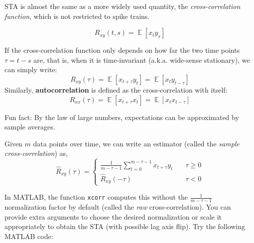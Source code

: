 \documentclass[letterpaper,11pt]{exam}
\DeclareMathOperator*{\E}{\mathbb{E}} %
\begin{document}
\begin{questions}
\newpage
STA is almost the same as a more widely used quantity, the \emph{cross-correlation function}, which is not restricted to spike trains.
\begin{tcolorbox}[colback=red!5!white,colframe=red!50!black]
\noindent
\begin{equation}
    R_{xy}(t,s) = \E[x_{t}y_s]
\end{equation}
\end{tcolorbox}
If the cross-correlation function only depends on how far the two time points $\tau = t-s$ are, that is, when it is time-invariant (a.k.a. wide-sense stationary), we can simply write:
\begin{equation}
    R_{xy}(\tau) = \E[x_{t+\tau}y_t] = \E[x_t y_{t-\tau}]
\end{equation}
Similarly, \textbf{autocorrelation} is defined as the cross-correlation with itself:
\begin{equation}
    R_{xx}(\tau) = \E[x_{t+\tau}x_t] = \E[x_t x_{t-\tau}]
\end{equation}
\begin{tcolorbox}
    Fun fact: By the law of large numbers, expectations can be approximated by sample averages.
\end{tcolorbox}
Given $m$ data points over time, we can write an estimator (called the \emph{sample cross-correlation}) as,
\begin{equation}
    \hat{R}_{xy}(\tau) = 
    \begin{cases}
	\frac{1}{m-\tau-1}\sum_{t=0}^{m-\tau-1} x_{t+\tau} y_t & \quad \tau \geq 0\\
	\hat{R}_{xy}(-\tau) & \quad \tau < 0
    \end{cases}
\end{equation}

In MATLAB, the function \texttt{xcorr} computes this without the $\frac{1}{m-\tau-1}$ normalization factor by default (called the \emph{raw} cross-correlation). You can provide extra arguments to choose the desired normalization or scale it appropriately to obtain the STA (with possible lag axis flip).
Try the following MATLAB code:



\end{questions}
\end{document}
